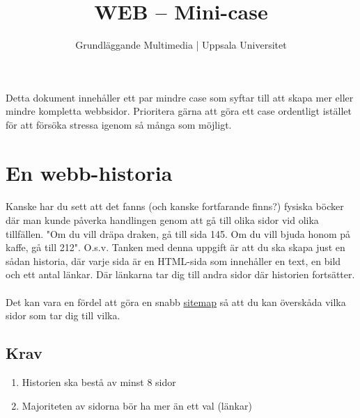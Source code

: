 \documentclass{article}
\begin{document}
  \title{ WEB -- Mini-case }
  \author{ Grundläggande Multimedia | Uppsala Universitet }
  \date{}
  \maketitle

  \paragraph{}
  Detta dokument innehåller ett par mindre case som syftar till att skapa mer eller mindre kompletta webbsidor. Prioritera gärna att göra ett case ordentligt istället för att försöka stressa igenom så många som möjligt.


  \newpage
  \section{ En webb-historia }
    \paragraph{}
    Kanske har du sett att det fanns (och kanske fortfarande finns?) fysiska böcker där man kunde påverka handlingen genom att gå till olika sidor vid olika tillfällen. "Om du vill dräpa draken, gå till sida 145. Om du vill bjuda honom på kaffe, gå till 212". O.s.v. Tanken med denna uppgift är att du ska skapa just en sådan historia, där varje sida är en HTML-sida som innehåller en text, en bild och ett antal länkar. Där länkarna tar dig till andra sidor där historien fortsätter.
    \paragraph{}
    Det kan vara en fördel att göra en snabb \href{https://www.google.se/search?q=sitemap&um=1&ie=UTF-8&hl=sv&tbm=isch&source=og&sa=N&tab=wi&ei=-QVEUqT6LdD74QT69YHYCg}{sitemap} så att du kan överskåda vilka sidor som tar dig till vilka.

    \subsection*{Krav}
      \begin{enumerate}
        \item Historien ska bestå av minst 8 sidor
        \item Majoriteten av sidorna bör ha mer än ett val (länkar)
      \end{enumerate}
\end{document}
